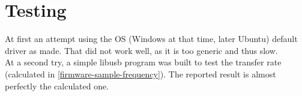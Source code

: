 \section{Testing}
At first an attempt using the OS (Windows at that time, later Ubuntu) default driver
as made. That did not work well, as it is too generic and thus slow. \\
At a second try, a simple libusb \cite{libusb} program was built to test the transfer
rate (calculated in \autoref{firmware-sample-frequency}). The reported result is
almost perfectly the calculated one.
